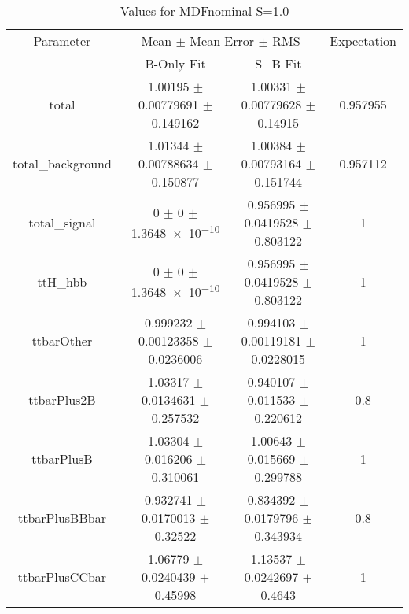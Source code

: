 \begin{table}
\centering
\caption{Values for MDFnominal S=1.0}
\begin{tabular}{cccc}
\toprule
Parameter & \multicolumn{2}{c}{Mean $\pm$ Mean Error $\pm$ RMS} & Expectation\\
 & B-Only Fit & S+B Fit & \\
\midrule
total & \num{1.00195} $\pm$ \num{0.00779691} $\pm$ \num{0.149162} & \num{1.00331} $\pm$ \num{0.00779628} $\pm$ \num{0.14915} & \num{0.957955}\\
total\_background & \num{1.01344} $\pm$ \num{0.00788634} $\pm$ \num{0.150877} & \num{1.00384} $\pm$ \num{0.00793164} $\pm$ \num{0.151744} & \num{0.957112}\\
total\_signal & \num{0} $\pm$ \num{0} $\pm$ \num{1.3648e-10} & \num{0.956995} $\pm$ \num{0.0419528} $\pm$ \num{0.803122} & \num{1}\\
ttH\_hbb & \num{0} $\pm$ \num{0} $\pm$ \num{1.3648e-10} & \num{0.956995} $\pm$ \num{0.0419528} $\pm$ \num{0.803122} & \num{1}\\
ttbarOther & \num{0.999232} $\pm$ \num{0.00123358} $\pm$ \num{0.0236006} & \num{0.994103} $\pm$ \num{0.00119181} $\pm$ \num{0.0228015} & \num{1}\\
ttbarPlus2B & \num{1.03317} $\pm$ \num{0.0134631} $\pm$ \num{0.257532} & \num{0.940107} $\pm$ \num{0.011533} $\pm$ \num{0.220612} & \num{0.8}\\
ttbarPlusB & \num{1.03304} $\pm$ \num{0.016206} $\pm$ \num{0.310061} & \num{1.00643} $\pm$ \num{0.015669} $\pm$ \num{0.299788} & \num{1}\\
ttbarPlusBBbar & \num{0.932741} $\pm$ \num{0.0170013} $\pm$ \num{0.32522} & \num{0.834392} $\pm$ \num{0.0179796} $\pm$ \num{0.343934} & \num{0.8}\\
ttbarPlusCCbar & \num{1.06779} $\pm$ \num{0.0240439} $\pm$ \num{0.45998} & \num{1.13537} $\pm$ \num{0.0242697} $\pm$ \num{0.4643} & \num{1}\\
\bottomrule
\end{tabular}
\end{table}